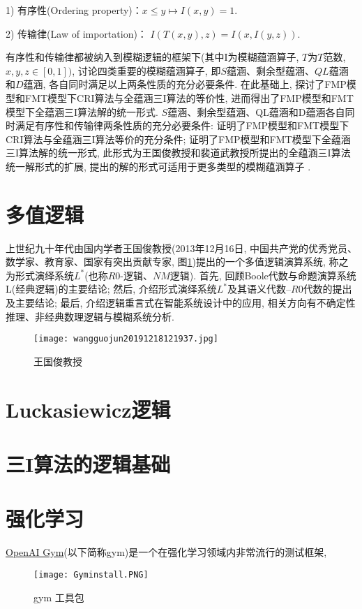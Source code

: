 1) 有序性(Ordering property)：$ x\leq y\longmapsto I(x,y)=1$.

2) 传输律(Law of importation)： $I(T(x,y),z)=I(x,I(y,z))$.

有序性和传输律都被纳入到模糊逻辑的框架下(其中I为模糊蕴涵算子, $T$为$T$范数, $x,y,z\in [0,1])$, 讨论四类重要的模糊蕴涵算子, 即$S$蕴涵、剩余型蕴涵、$QL$蕴涵和$D$蕴涵, 各自同时满足以上两条性质的充分必要条件.
在此基础上, 探讨了FMP模型和FMT模型下CRI算法与全蕴涵三I算法的等价性, 进而得出了FMP模型和FMT模型下全蕴涵三I算法解的统一形式.
$S$蕴涵、剩余型蕴涵、QL蕴涵和D蕴涵各自同时满足有序性和传输律两条性质的充分必要条件: 证明了FMP模型和FMT模型下CRI算法与全蕴涵三I算法等价的充分条件;
证明了FMP模型和FMT模型下全蕴涵三I算法解的统一形式, 此形式为王国俊教授和裴道武教授所提出的全蕴涵三I算法统一解形式的扩展, 提出的解的形式可适用于更多类型的模糊蕴涵算子 .
\section{多值逻辑}
上世纪九十年代由国内学者王国俊教授(2013年12月16日, 中国共产党的优秀党员、数学家、教育家、国家有突出贡献专家, 图\ref{wangguojun20191218121937})提出的一个多值逻辑演算系统, 称之为形式演绎系统$L^*$(也称$R0$-逻辑、$NM$逻辑). 首先, 回顾Boole代数与命题演算系统L(经典逻辑)的主要结论; 然后, 介绍形式演绎系统$L^*$及其语义代数--$R0$代数的提出及主要结论; 最后, 介绍逻辑重言式在智能系统设计中的应用, 相关方向有不确定性推理、非经典数理逻辑与模糊系统分析.
\begin{figure}[H]
\centering
\texttt{[image: wangguojun20191218121937.jpg]}
\caption{王国俊教授}
\label{wangguojun20191218121937}
\end{figure}
\section{Luckasiewicz逻辑}
\section{三I算法的逻辑基础}
\section{强化学习}
\href{https://gym.openai.com/}{OpenAI Gym}(以下简称gym)是一个在强化学习领域内非常流行的测试框架,
\begin{figure}[H]
\centering
\texttt{[image: Gyminstall.PNG]}
\caption{gym 工具包}
\label{Gyminstall}
\end{figure}

